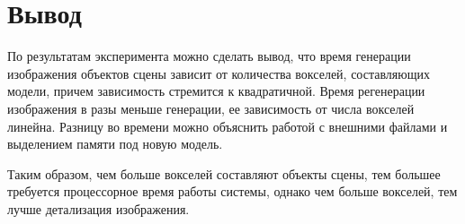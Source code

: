 \section*{Вывод}
По результатам эксперимента можно сделать вывод, что время генерации изображения объектов сцены зависит от ко­личества вокселей, составляющих модели, причем зависимость стремится к квадратичной. Время регенерации изображения в разы меньше генерации, ее зависимость от числа вокселей линейна. Разницу во времени можно объяснить работой с внешними файлами и выделением памяти под новую модель.

Таким образом, чем больше вокселей составляют объекты сцены, тем большее требуется процессорное время работы системы, однако чем больше вокселей, тем лучше детализация изоб­ражения.



